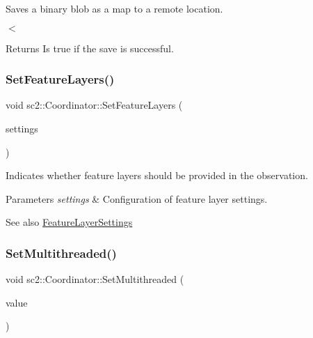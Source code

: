 Saves a binary blob as a map to a remote location. 

$<$ \begin{DoxyReturn}{Returns}
Is true if the save is successful. 
\end{DoxyReturn}
\mbox{\label{classsc2_1_1_coordinator_ab46aec5712f6ec8ef12b03854f6e0495}} 
\subsubsection{\texorpdfstring{Set\+Feature\+Layers()}{SetFeatureLayers()}}
{\footnotesize\ttfamily void sc2\+::\+Coordinator\+::\+Set\+Feature\+Layers (\begin{DoxyParamCaption}\item[{const \hyperlink{structsc2_1_1_feature_layer_settings}{Feature\+Layer\+Settings} \&}]{settings }\end{DoxyParamCaption})}

Indicates whether feature layers should be provided in the observation. 
\begin{DoxyParams}{Parameters}
{\em settings} & Configuration of feature layer settings. \\
\hline
\end{DoxyParams}
\begin{DoxySeeAlso}{See also}
\hyperlink{structsc2_1_1_feature_layer_settings}{Feature\+Layer\+Settings} 
\end{DoxySeeAlso}
\mbox{\label{classsc2_1_1_coordinator_a555587bc85ac437711d15b569c75181a}} 
\subsubsection{\texorpdfstring{Set\+Multithreaded()}{SetMultithreaded()}}
{\footnotesize\ttfamily void sc2\+::\+Coordinator\+::\+Set\+Multithreaded (\begin{DoxyParamCaption}\item[{bool}]{value }\end{DoxyParamCaption})}

